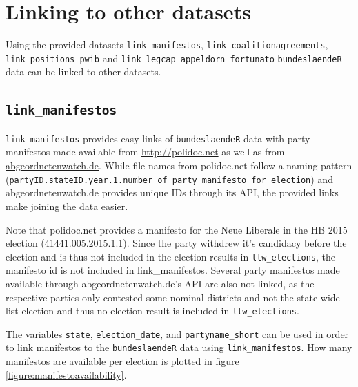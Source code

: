 \documentclass[
]{scrartcl}
\begin{document}
\clearpage

\hypertarget{linking-to-other-datasets}{%
\section{Linking to other datasets}\label{linking-to-other-datasets}}

Using the provided datasets \texttt{link\_manifestos},
\texttt{link\_coalitionagreements}, \texttt{link\_positions\_pwib} and
\texttt{link\_legcap\_appeldorn\_fortunato} \texttt{bundeslaendeR} data
can be linked to other datasets.

\hypertarget{link_manifestos}{%
\subsection{\texorpdfstring{\texttt{link\_manifestos}}{link\_manifestos}}\label{link_manifestos}}

\texttt{link\_manifestos} provides easy links of \texttt{bundeslaendeR}
data with party manifestos made available from \url{http://polidoc.net}
\parencites{benoitChallengesEstimatingPolicy2009}{grossDoesEURegional2018}{pappiPolitikpositionenDeutschenLandtagsparteien2014}{pappiPartyElectionProgrammes2009}[for the codebook see][]{brauningerPolidocNetCodebook2018}
as well as from \url{abgeordnetenwatch.de}. While file names from
polidoc.net follow a naming pattern
(\texttt{{partyID}.{stateID}.{year}.{1}.{number of party manifesto for election}})
and abgeordnetenwatch.de provides unique IDs through its API, the
provided links make joining the data easier.

Note that polidoc.net provides a manifesto for the Neue Liberale in the
HB 2015 election (41441.005.2015.1.1). Since the party withdrew it's
candidacy before the election and is thus not included in the election
results in \texttt{ltw\_elections}, the manifesto id is not included in
link\_manifestos. Several party manifestos made available through
abgeordnetenwatch.de's API are also not linked, as the respective
parties only contested some nominal districts and not the state-wide
list election and thus no election result is included in
\texttt{ltw\_elections}.

The variables \texttt{state}, \texttt{election\_date}, and
\texttt{partyname\_short} can be used in order to link manifestos to the
\texttt{bundeslaendeR} data using \texttt{link\_manifestos}. How many
manifestos are available per election is plotted in
figure\(~\)\ref{figure:manifestoavailability}.
\end{document}
